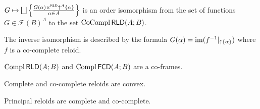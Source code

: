 \begin{cor}
$G\mapsto\bigsqcup\left\{ \frac{G(\alpha)\times^{\mathsf{RLD}}\uparrow^{A}\{\alpha\}}{\alpha\in A}\right\}$
is an order isomorphism from the set of functions $G\in\mathscr{F}(B)^{A}$
to the set $\operatorname{CoCompl}\mathsf{RLD}(A;B)$.

The inverse isomorphism is described by the formula $G(\alpha)=\operatorname{im}(f^{-1}|_{\uparrow\{\alpha\}})$
where $f$ is a co-complete reloid.
\end{cor}

\begin{cor}
$\operatorname{Compl}\mathsf{RLD}(A;B)$ and $\operatorname{Compl}\mathsf{FCD}(A;B)$ are a co-frames.\end{cor}
\begin{obvious}
Complete and co-complete reloids are convex.
\end{obvious}

\begin{obvious}
Principal reloids are complete and co-complete.
\end{obvious}

